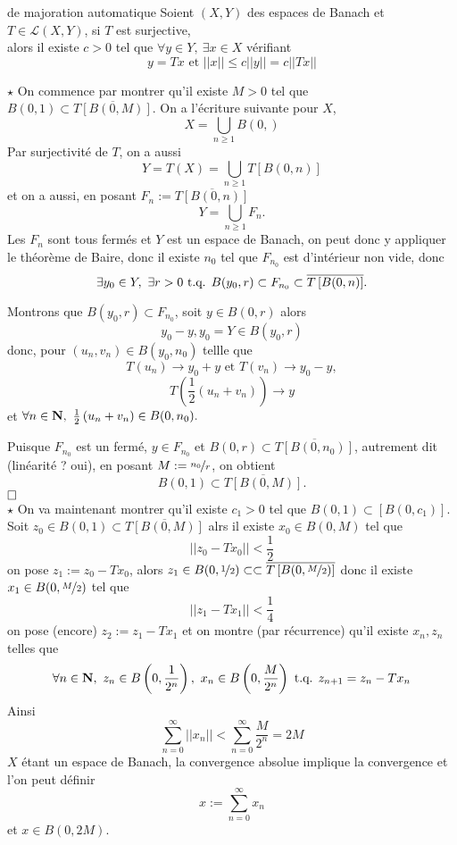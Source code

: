 \documentclass[a4paper,11pt, twoside]{article}
\begin{document}
\begin{thC}{de majoration automatique}
  Soient $(X,Y)$ des espaces de Banach et $T\in\mathcal L(X,Y)$, si $T$ est surjective,\\

  alors il existe $c>0$ tel que $\forall y\in Y,\ \exists x\in X$ vérifiant
  $$y=Tx\text{ et }||x||\leqslant c||y||=c||Tx||$$
\end{thC}


\begin{Proof}
  $\star$ On commence par montrer qu'il existe $M>0$ tel que $B(0,1)\subset \overline{T\left[B(0,M)\right]}$. On a l'écriture suivante pour $X$,
  $$X=\bigcup_{n\geqslant 1}B(0,)$$
  Par surjectivité de $T$, on a aussi
  $$Y=T(X)=\bigcup_{n\geqslant 1}T\left[B(0,n)\right]$$
  et on a aussi, en posant $F_n:=\overline{T\left[B(0,n)\right]}$
  $$Y=\bigcup_{n\geqslant 1}F_n.$$
  Les $F_n$ sont tous fermés et $Y$ est un espace de Banach, on peut donc y appliquer le théorème de Baire, donc il existe $n_0$ tel que $F_{n_0}$ est d'intérieur non vide, donc
  $$\exists y_0\in Y,\ \exists r>0\text{ t.q. } B(y_0,r)\subset F_{n_0}\subset \overline{T\left[B(0,n)\right]}.$$

  Montrons que $B(y_0,r)\subset F_{n_0}$, soit $y\in B(0,r)$ alors 
  $$y_0-y,y_0=Y\in B(y_0,r)$$
  donc, pour $(u_n,v_n)\in B(y_0,n_0)$ tellle que 
  $$T(u_n)\longrightarrow y_0+y\text{ et }T(v_n)\longrightarrow y_0-y,$$
  $$T\left(\frac12\left(u_n+v_n\right)\right)\longrightarrow y$$
  et $\forall n\in\N,\ \frac12\left(u_n+v_n\right)\in B(0,n_0).$

  Puisque $F_{n_0}$ est un fermé, $y\in F_{n_0}$ et $B(0,r)\subset\overline{T\left[B(0,n_0)\right]}$, autrement dit (linéarité ? oui), en posant $M:=\nicefrac{n_0}{r}$, on obtient 
  $$B(0,1)\subset \overline{T\left[B(0,M)\right]}.$$
  $\hfill\square$\\

  $\star$ On va maintenant montrer qu'il existe $c_1>0$ tel que $B(0,1)\subset\left[B(0,c_1)\right].$ Soit $z_0\in B(0,1)\subset \overline{T\left[B(0,M)\right]}$ alrs il existe $x_0\in B(0,M)$ tel que
  $$||z_0-Tx_0||<\frac12$$
  on pose $z_1:=z_0-Tx_0$, alors $z_1\in B(0,\nicefrac12)\subset \subset \overline{T\left[B(0,\nicefrac{M}{2})\right]}$ donc il existe $x_1\in B(0,\nicefrac{M}{2})$ tel que 
  $$||z_1-Tx_1||<\frac14$$
  on pose (encore) $z_2:=z_1-Tx_1$ et on montre (par récurrence) qu'il existe $x_n,z_n$ telles que 
  $$\forall n\in \mathbf N,\ z_n\in B\left(0,\frac{1}{2^n}\right),\ x_n\in B\left(0,\frac{M}{2^n}\right)\text{ t.q. } z_{n+1}=z_n-Tx_n$$
  Ainsi 
  $$\sum_{n=0}^\infty ||x_n||<\sum_{n=0}^\infty\frac{M}{2^n}=2M$$
  $X$ étant un espace de Banach, la convergence absolue implique la convergence et l'on peut définir 
  $$x:=\sum_{n=0}^\infty x_n$$
  et $x\in B(0,2M)$.


\end{Proof}
\end{document}
